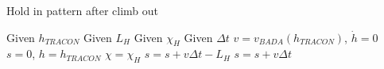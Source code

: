 \documentclass[11pt]{book}              %
\begin{document}
\begin{algorithm}[H]
\caption{Hold in pattern after climb out}\label{alg:PropAlgo7.1}
\begin{algorithmic}[1]
\State Given $h_{TRACON}$ 
\State Given $L_{H}$ 
\State Given $\chi_{H}$ 
\State Given $\Delta t$
\State $v = v_{BADA}(h_{TRACON})$, $\dot{h} = 0$
\State $s=0$, $h = h_{TRACON}$
\State $\chi = \chi_{H}$
\State $s = s+v\Delta t - L_{H}$
\Else
\State $s = s+v\Delta t$
\EndIf
\EndWhile 
\end{algorithmic}
\end{algorithm}
\end{document}
